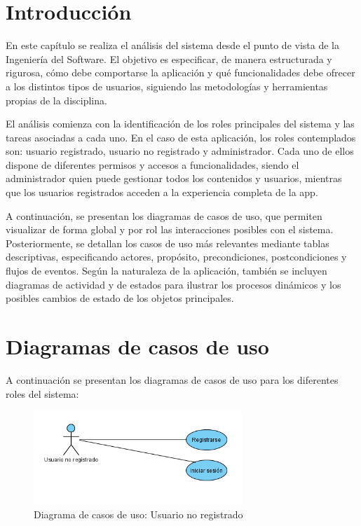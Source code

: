 
\section*{Introducción}

En este capítulo se realiza el análisis del sistema desde el punto de vista de la Ingeniería del Software. El objetivo es especificar, de manera estructurada y rigurosa, cómo debe comportarse la aplicación y qué funcionalidades debe ofrecer a los distintos tipos de usuarios, siguiendo las metodologías y herramientas propias de la disciplina.

El análisis comienza con la identificación de los roles principales del sistema y las tareas asociadas a cada uno. En el caso de esta aplicación, los roles contemplados son: usuario registrado, usuario no registrado y administrador. Cada uno de ellos dispone de diferentes permisos y accesos a funcionalidades, siendo el administrador quien puede gestionar todos los contenidos y usuarios, mientras que los usuarios registrados acceden a la experiencia completa de la app.

A continuación, se presentan los diagramas de casos de uso, que permiten visualizar de forma global y por rol las interacciones posibles con el sistema. Posteriormente, se detallan los casos de uso más relevantes mediante tablas descriptivas, especificando actores, propósito, precondiciones, postcondiciones y flujos de eventos. Según la naturaleza de la aplicación, también se incluyen diagramas de actividad y de estados para ilustrar los procesos dinámicos y los posibles cambios de estado de los objetos principales.

\section{Diagramas de casos de uso}

A continuación se presentan los diagramas de casos de uso para los diferentes roles del sistema:

\begin{figure}[H]
    \centering
    \includegraphics[width=0.7\textwidth]{figs/diagrama_usuario_no_registrado.png}
    \caption{Diagrama de casos de uso: Usuario no registrado}
\end{figure}

